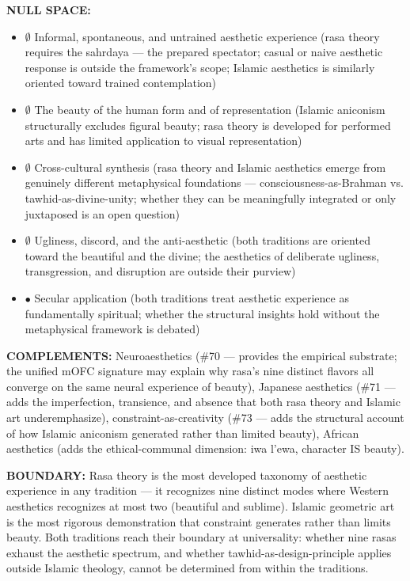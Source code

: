 \textbf{NULL SPACE:}

\begin{itemize}[nosep,leftmargin=*]
  \item $\emptyset$ Informal, spontaneous, and untrained aesthetic experience (rasa theory requires the sahrdaya — the prepared spectator; casual or naive aesthetic response is outside the framework's scope; Islamic aesthetics is similarly oriented toward trained contemplation)
  \item $\emptyset$ The beauty of the human form and of representation (Islamic aniconism structurally excludes figural beauty; rasa theory is developed for performed arts and has limited application to visual representation)
  \item $\emptyset$ Cross-cultural synthesis (rasa theory and Islamic aesthetics emerge from genuinely different metaphysical foundations — consciousness-as-Brahman vs. tawhid-as-divine-unity; whether they can be meaningfully integrated or only juxtaposed is an open question)
  \item $\emptyset$ Ugliness, discord, and the anti-aesthetic (both traditions are oriented toward the beautiful and the divine; the aesthetics of deliberate ugliness, transgression, and disruption are outside their purview)
  \item $\bullet$ Secular application (both traditions treat aesthetic experience as fundamentally spiritual; whether the structural insights hold without the metaphysical framework is debated)
\end{itemize}


\textbf{COMPLEMENTS:} Neuroaesthetics (\#70 — provides the empirical substrate; the unified mOFC signature may explain why rasa's nine distinct flavors all converge on the same neural experience of beauty), Japanese aesthetics (\#71 — adds the imperfection, transience, and absence that both rasa theory and Islamic art underemphasize), constraint-as-creativity (\#73 — adds the structural account of how Islamic aniconism generated rather than limited beauty), African aesthetics (adds the ethical-communal dimension: iwa l'ewa, character IS beauty).


\textbf{BOUNDARY:} Rasa theory is the most developed taxonomy of aesthetic experience in any tradition — it recognizes nine distinct modes where Western aesthetics recognizes at most two (beautiful and sublime). Islamic geometric art is the most rigorous demonstration that constraint generates rather than limits beauty. Both traditions reach their boundary at universality: whether nine rasas exhaust the aesthetic spectrum, and whether tawhid-as-design-principle applies outside Islamic theology, cannot be determined from within the traditions.


